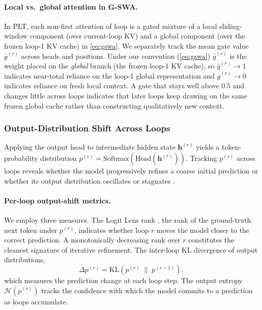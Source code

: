 \documentclass{llmxive}
\providecommand{\hidden}{\mathbf{h}}
\begin{document}
\paragraph{Local vs.\ global attention in G-SWA.}
In PLT, each non-first attention of loop is a gated mixture of a local
sliding-window component (over current-loop KV) and a global component
(over the frozen loop-1 KV cache) in \autoref{eq:gswa}.
We separately track the mean gate value $\bar{g}^{(r)}$ across heads and
positions. Under our convention (\autoref{eq:gswa}) $\bar{g}^{(r)}$ is the
weight placed on the \emph{global} branch (the frozen loop-1 KV cache), so
$\bar{g}^{(r)}\!\to\!1$ indicates near-total reliance on the loop-1 global
representation and $\bar{g}^{(r)}\!\to\!0$ indicates reliance on fresh local
context.
A gate that stays well above $0.5$ and changes little across loops indicates
that later loops keep drawing on the same frozen global cache rather than
constructing qualitatively new context.

\subsubsection{Output-Distribution Shift Across Loops}
\label{sec:analysis-output}

Applying the output head to intermediate hidden state $\hidden^{(r)}$ yields
a token-probability distribution
$p^{(r)} = \mathrm{Softmax}(\mathrm{Head}(\hidden^{(r)}))$.
Tracking $p^{(r)}$ across loops reveals whether the model progressively
refines a coarse initial prediction or whether its output distribution
oscillates or stagnates \citep{chen2026loop}.

\paragraph{Per-loop output-shift metrics.}
We employ three measures.
The Logit Lens rank \citep{lu2025latent}, the rank of the ground-truth
next token under $p^{(r)}$, indicates whether loop $r$ moves the model
closer to the correct prediction. A monotonically decreasing rank over $r$
constitutes the cleanest signature of iterative refinement.
The inter-loop KL divergence of output distributions,
\begin{equation}
  \Delta p^{(r)} = \mathrm{KL}\!\left(p^{(r)} \;\|\; p^{(r-1)}\right),
  \label{eq:output-shift}
\end{equation}
which measures the prediction change at each loop step.
The output entropy $\mathcal{H}(p^{(r)})$ tracks the confidence with which
the model commits to a prediction as loops accumulate.
\end{document}

